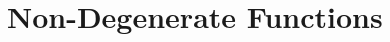 \documentclass[a4paper,11pt]{article}
\begin{document}
\section{Non-Degenerate Functions}













\end{document}
